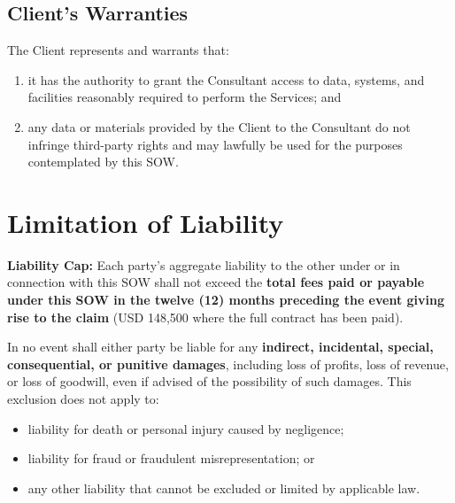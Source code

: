 \subsection{Client's Warranties}

The Client represents and warrants that:

\begin{enumerate}[label=(\roman*)]
  \item it has the authority to grant the Consultant access to data, systems, and
    facilities reasonably required to perform the Services; and
  \item any data or materials provided by the Client to the Consultant do not
    infringe third-party rights and may lawfully be used for the purposes contemplated
    by this SOW.
\end{enumerate}

\section{Limitation of Liability}

\begin{tcolorbox}[
  enhanced, colback=LightSlate, colframe=AccentTeal,
  boxrule=0pt, leftrule=3pt, arc=2pt,
  top=6pt, bottom=6pt, left=10pt, right=10pt
]
\small\faLock\enspace\textbf{Liability Cap:} Each party's aggregate liability to the
other under or in connection with this SOW shall not exceed the \textbf{total fees
paid or payable under this SOW in the twelve (12) months preceding the event giving
rise to the claim} (USD 148{,}500 where the full contract has been paid).
\end{tcolorbox}

\vspace{8pt}

In no event shall either party be liable for any \textbf{indirect, incidental, special,
consequential, or punitive damages}, including loss of profits, loss of revenue, or
loss of goodwill, even if advised of the possibility of such damages. This exclusion
does not apply to:

\begin{itemize}
  \item liability for death or personal injury caused by negligence;
  \item liability for fraud or fraudulent misrepresentation; or
  \item any other liability that cannot be excluded or limited by applicable law.
\end{itemize}

